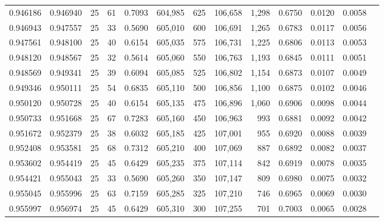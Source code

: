 \begin{tabular}{rrrrrrrrrrrrr}
0.946186 & 0.946940 &    25 &  61 &                                     0.7093 & 604,985 &     625 & 106,658 &   1,298 & 0.6750 & 0.0120 & 0.0058 \\
0.946943 & 0.947557 &    25 &  33 &                                     0.5690 & 605,010 &     600 & 106,691 &   1,265 & 0.6783 & 0.0117 & 0.0056 \\
0.947561 & 0.948100 &    25 &  40 &                                     0.6154 & 605,035 &     575 & 106,731 &   1,225 & 0.6806 & 0.0113 & 0.0053 \\
0.948120 & 0.948567 &    25 &  32 &                                     0.5614 & 605,060 &     550 & 106,763 &   1,193 & 0.6845 & 0.0111 & 0.0051 \\
0.948569 & 0.949341 &    25 &  39 &                                     0.6094 & 605,085 &     525 & 106,802 &   1,154 & 0.6873 & 0.0107 & 0.0049 \\
0.949346 & 0.950111 &    25 &  54 &                                     0.6835 & 605,110 &     500 & 106,856 &   1,100 & 0.6875 & 0.0102 & 0.0046 \\
0.950120 & 0.950728 &    25 &  40 &                                     0.6154 & 605,135 &     475 & 106,896 &   1,060 & 0.6906 & 0.0098 & 0.0044 \\
0.950733 & 0.951668 &    25 &  67 &                                     0.7283 & 605,160 &     450 & 106,963 &     993 & 0.6881 & 0.0092 & 0.0042 \\
0.951672 & 0.952379 &    25 &  38 &                                     0.6032 & 605,185 &     425 & 107,001 &     955 & 0.6920 & 0.0088 & 0.0039 \\
0.952408 & 0.953581 &    25 &  68 &                                     0.7312 & 605,210 &     400 & 107,069 &     887 & 0.6892 & 0.0082 & 0.0037 \\
0.953602 & 0.954419 &    25 &  45 &                                     0.6429 & 605,235 &     375 & 107,114 &     842 & 0.6919 & 0.0078 & 0.0035 \\
0.954421 & 0.955043 &    25 &  33 &                                     0.5690 & 605,260 &     350 & 107,147 &     809 & 0.6980 & 0.0075 & 0.0032 \\
0.955045 & 0.955996 &    25 &  63 &                                     0.7159 & 605,285 &     325 & 107,210 &     746 & 0.6965 & 0.0069 & 0.0030 \\
0.955997 & 0.956974 &    25 &  45 &                                     0.6429 & 605,310 &     300 & 107,255 &     701 & 0.7003 & 0.0065 & 0.0028 \\

\end{tabular}
